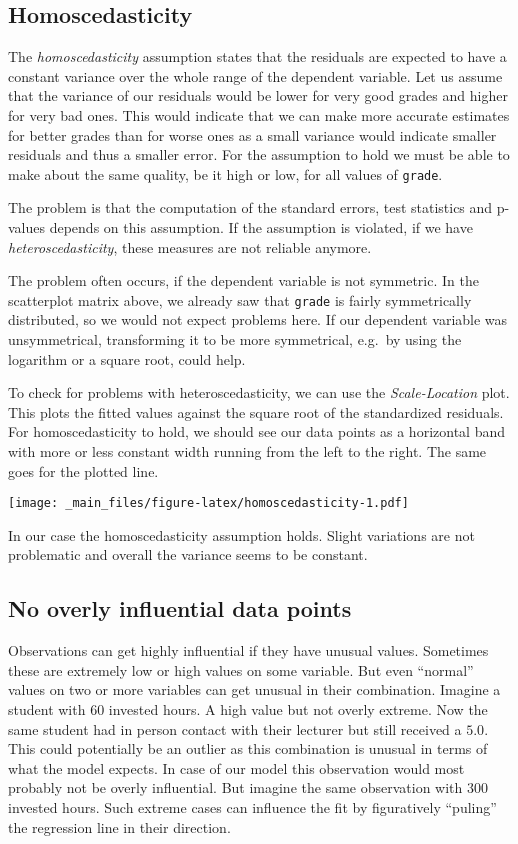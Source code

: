 \documentclass[
]{book}
\begin{document}
\hypertarget{homoscedasticity}{%
\subsection{Homoscedasticity}\label{homoscedasticity}}

The \emph{homoscedasticity} assumption states that the residuals are expected to have
a constant variance over the whole range of the dependent variable. Let us
assume that the variance of our residuals would be lower for very good grades
and higher for very bad ones. This would indicate that we can make more accurate
estimates for better grades than for worse ones as a small variance would
indicate smaller residuals and thus a smaller error. For the assumption to hold
we must be able to make about the same quality, be it high or low, for all
values of \texttt{grade}.

The problem is that the computation of the standard errors, test statistics and
p-values depends on this assumption. If the assumption is violated, if we have
\emph{heteroscedasticity}, these measures are not reliable anymore.

The problem often occurs, if the dependent variable is not symmetric. In the
scatterplot matrix above, we already saw that \texttt{grade} is fairly symmetrically
distributed, so we would not expect problems here. If our dependent variable was
unsymmetrical, transforming it to be more symmetrical, e.g.~by using the
logarithm or a square root, could help.

To check for problems with heteroscedasticity, we can use the \emph{Scale-Location}
plot. This plots the fitted values against the square root of the standardized
residuals. For homoscedasticity to hold, we should see our data points as a
horizontal band with more or less constant width running from the left to the
right. The same goes for the plotted line.

\texttt{[image: \_main\_files/figure-latex/homoscedasticity-1.pdf]}

In our case the homoscedasticity assumption holds. Slight variations are not
problematic and overall the variance seems to be constant.

\hypertarget{no-overly-influential-data-points}{%
\subsection{No overly influential data points}\label{no-overly-influential-data-points}}

Observations can get highly influential if they have unusual values. Sometimes
these are extremely low or high values on some variable. But even ``normal'' values
on two or more variables can get unusual in their combination. Imagine a student
with \(60\) invested hours. A high value but not overly extreme. Now the same student
had in person contact with their lecturer but still received a \(5.0\). This could
potentially be an outlier as this combination is unusual in terms of what the
model expects. In case of our model this observation would most probably not be
overly influential. But imagine the same observation with \(300\) invested hours.
Such extreme cases can influence the fit by figuratively ``puling'' the regression
line in their direction.
\end{document}
